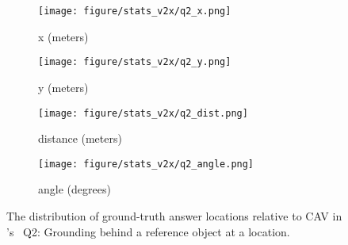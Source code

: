 \begin{figure}[!t]
        \centering
        \begin{subfigure}[t]{0.23\textwidth}
            \centering 
            \texttt{[image: figure/stats\_v2x/q2\_x.png]}
            \vspace{-20pt}
            \caption[]%
            {{x (meters)}}    
        \end{subfigure}
        \hfill
        \begin{subfigure}[t]{0.23\textwidth}  
            \centering 
            \texttt{[image: figure/stats\_v2x/q2\_y.png]}
            \vspace{-20pt}
            \caption[]%
            {{y (meters)}}
        \end{subfigure}

        \begin{subfigure}[t]{0.23\textwidth}
            \centering 
            \texttt{[image: figure/stats\_v2x/q2\_dist.png]}
            \vspace{-20pt}
            \caption[]%
            {{distance (meters)}}
        \end{subfigure}
        \hfill
        \begin{subfigure}[t]{0.23\textwidth}
            \centering 
            \texttt{[image: figure/stats\_v2x/q2\_angle.png]}
            \vspace{-20pt}
            \caption[]%
            {{angle (degrees)}}
        \end{subfigure}
        \hfill
        
        \vspace{-10pt}
        \caption[]
        {
        The distribution of ground-truth answer locations relative to CAV in \namedataset's \namexsplit~Q2: Grounding behind a reference object at a location. 
        } 
        \label{fig:stats_v2x_q2}
        \vspace{-10pt}
\end{figure}

